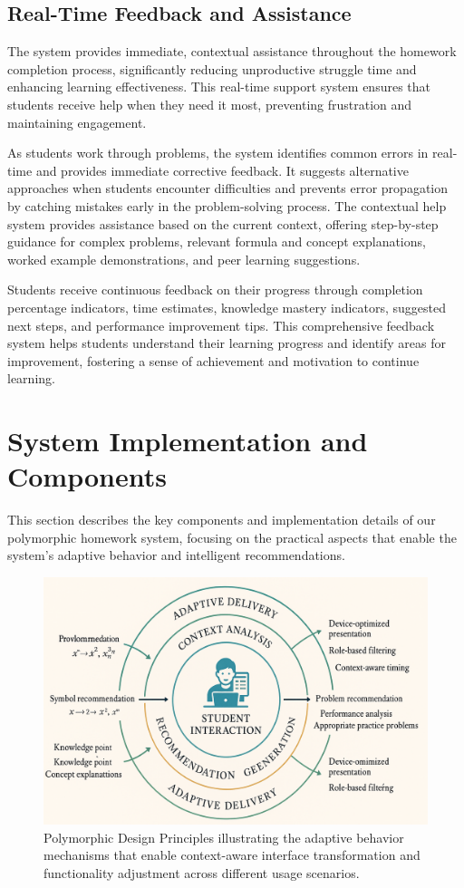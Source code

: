 \documentclass[conference]{IEEEtran}
\begin{document}
\subsection{Real-Time Feedback and Assistance}

The system provides immediate, contextual assistance throughout the homework completion process, significantly reducing unproductive struggle time and enhancing learning effectiveness. This real-time support system ensures that students receive help when they need it most, preventing frustration and maintaining engagement.

As students work through problems, the system identifies common errors in real-time and provides immediate corrective feedback. It suggests alternative approaches when students encounter difficulties and prevents error propagation by catching mistakes early in the problem-solving process. The contextual help system provides assistance based on the current context, offering step-by-step guidance for complex problems, relevant formula and concept explanations, worked example demonstrations, and peer learning suggestions.

Students receive continuous feedback on their progress through completion percentage indicators, time estimates, knowledge mastery indicators, suggested next steps, and performance improvement tips. This comprehensive feedback system helps students understand their learning progress and identify areas for improvement, fostering a sense of achievement and motivation to continue learning.

\section{System Implementation and Components}

This section describes the key components and implementation details of our polymorphic homework system, focusing on the practical aspects that enable the system's adaptive behavior and intelligent recommendations.

\begin{figure}[htbp]
\centerline{\includegraphics[width=\columnwidth]{2.png}}
\caption{Polymorphic Design Principles illustrating the adaptive behavior mechanisms that enable context-aware interface transformation and functionality adjustment across different usage scenarios.}
\label{fig:polymorphic}
\end{figure}
\end{document}
